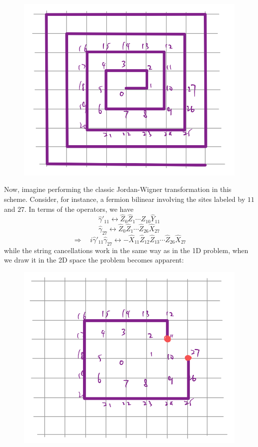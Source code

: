 \begin{figure}[H]
    \centering
    \includegraphics[width=\textwidth]{jupyterbook/data/fig/lec26-fig09.png}
\end{figure}
Now, imagine performing the classic Jordan-Wigner transformation in this scheme. Consider, for instance, a fermion bilinear involving the sites labeled by $11$ and $27$. In terms of the operators, we have
\[ \hat{\gamma}'_{11}\leftrightarrow \hat{Z}_0\hat{Z}_1\cdots \hat{Z}_{10}\hat{Y}_{11}\]
\[ \hat{\gamma}_{27}\leftrightarrow \hat{Z}_0\hat{Z}_1\cdots \hat{Z}_{26}\hat{X}_{27}\]
\[ \Rightarrow \quad i\hat{\gamma}'_{11}\hat{\gamma}_{27}\leftrightarrow -\hat{X}_{11}\hat{Z}_{12}\hat{Z}_{13}\cdots \hat{Z}_{26}\hat{X}_{27}\]
while the string cancellations work in the same way as in the 1D problem, when we draw it in the 2D space the problem becomes apparent:
\begin{figure}[H]
    \centering
    \includegraphics[width=\textwidth]{jupyterbook/data/fig/lec26-fig10.png}
\end{figure}
